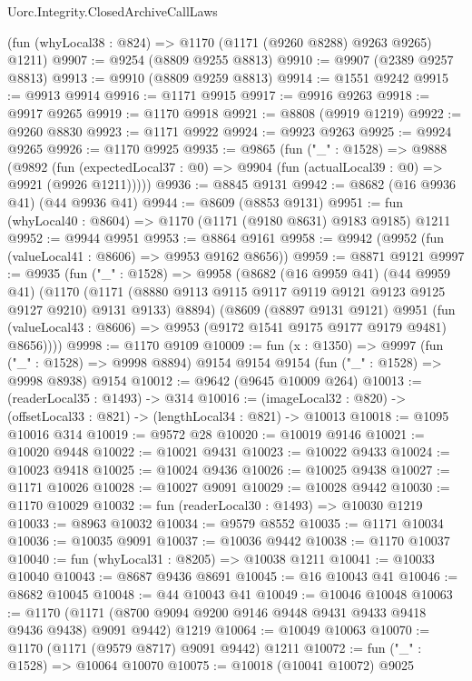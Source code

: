 \begin{lexlean}{Uorc.Integrity.ClosedArchiveCallLaws}
\begin{coremodule}
    (fun (whyLocal38 : @824) => @1170 (@1171 (@9260 @8288) @9263 @9265) @1211)
@9907 := @9254 (@8809 @9255 @8813)
@9910 := @9907 (@2389 @9257 @8813)
@9913 := @9910 (@8809 @9259 @8813)
@9914 := @1551 @9242
@9915 := @9913 @9914
@9916 := @1171 @9915
@9917 := @9916 @9263
@9918 := @9917 @9265
@9919 := @1170 @9918
@9921 := @8808 (@9919 @1219)
@9922 := @9260 @8830
@9923 := @1171 @9922
@9924 := @9923 @9263
@9925 := @9924 @9265
@9926 := @1170 @9925
@9935 := @9865
    (fun ("_" : @1528) =>
    @9888
      (@9892
        (fun (expectedLocal37 : @0) => @9904 (fun (actualLocal39 : @0) => @9921 (@9926 @1211)))))
@9936 := @8845 @9131
@9942 := @8682 (@16 @9936 @41) (@44 @9936 @41)
@9944 := @8609 (@8853 @9131)
@9951 := fun (whyLocal40 : @8604) => @1170 (@1171 (@9180 @8631) @9183 @9185) @1211
@9952 := @9944 @9951
@9953 := @8864 @9161
@9958 := @9942 (@9952 (fun (valueLocal41 : @8606) => @9953 @9162 @8656))
@9959 := @8871 @9121
@9997 := @9935
    (fun ("_" : @1528) =>
    @9958
      (@8682
        (@16 @9959 @41)
        (@44 @9959 @41)
        (@1170
          (@1171 (@8880 @9113 @9115 @9117 @9119 @9121 @9123 @9125 @9127 @9210) @9131 @9133)
          @8894)
        (@8609
          (@8897 @9131 @9121)
          @9951
          (fun (valueLocal43 : @8606) => @9953 (@9172 @1541 @9175 @9177 @9179 @9481) @8656))))
@9998 := @1170 @9109
@10009 := fun (x : @1350) =>
  @9997
    (fun ("_" : @1528) => @9998 @8894)
    @9154
    @9154
    @9154
    (fun ("_" : @1528) => @9998 @8938)
    @9154
@10012 := @9642 (@9645 @10009 @264)
@10013 := (readerLocal35 : @1493) -> @314
@10016 := (imageLocal32 : @820) -> (offsetLocal33 : @821) -> (lengthLocal34 : @821) -> @10013
@10018 := @1095 @10016 @314
@10019 := @9572 @28
@10020 := @10019 @9146
@10021 := @10020 @9448
@10022 := @10021 @9431
@10023 := @10022 @9433
@10024 := @10023 @9418
@10025 := @10024 @9436
@10026 := @10025 @9438
@10027 := @1171 @10026
@10028 := @10027 @9091
@10029 := @10028 @9442
@10030 := @1170 @10029
@10032 := fun (readerLocal30 : @1493) => @10030 @1219
@10033 := @8963 @10032
@10034 := @9579 @8552
@10035 := @1171 @10034
@10036 := @10035 @9091
@10037 := @10036 @9442
@10038 := @1170 @10037
@10040 := fun (whyLocal31 : @8205) => @10038 @1211
@10041 := @10033 @10040
@10043 := @8687 @9436 @8691
@10045 := @16 @10043 @41
@10046 := @8682 @10045
@10048 := @44 @10043 @41
@10049 := @10046 @10048
@10063 := @1170
    (@1171 (@8700 @9094 @9200 @9146 @9448 @9431 @9433 @9418 @9436 @9438) @9091 @9442)
    @1219
@10064 := @10049 @10063
@10070 := @1170 (@1171 (@9579 @8717) @9091 @9442) @1211
@10072 := fun ("_" : @1528) => @10064 @10070
@10075 := @10018 (@10041 @10072) @9025

\end{coremodule}
\end{lexlean}
